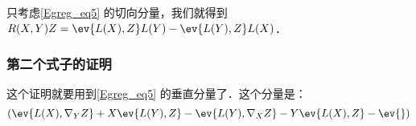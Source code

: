 只考虑\autoref{Egreg_eq5} 的切向分量，我们就得到$R(X, Y)Z=\ev{L(X), Z}L(Y)-\ev{L(Y), Z}L(X)$．








\subsubsection{第二个式子的证明}

这个证明就要用到\autoref{Egreg_eq5} 的垂直分量了．这个分量是：
\begin{equation}
(\ev{L(X), \nabla_YZ}+X\ev{L(Y), Z}-\ev{L(Y), \nabla_XZ}-Y\ev{L(X), Z}-\ev{})
\end{equation}




















